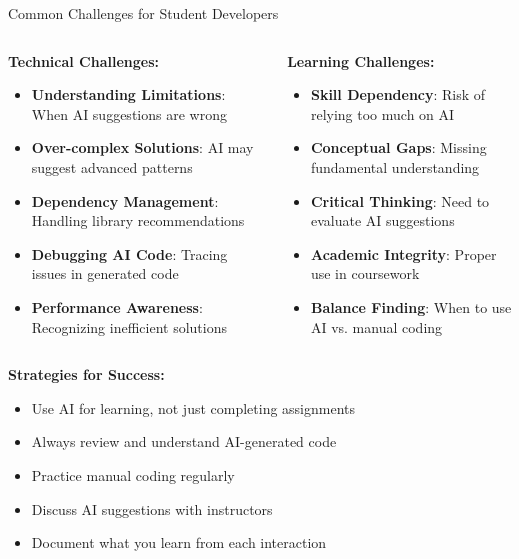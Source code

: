 \documentclass{beamer}
\begin{document}
\begin{frame}[t]{Common Challenges for Student Developers}
    \begin{columns}
        \begin{column}{0.5\textwidth}
            \textbf{Technical Challenges:}
            \begin{itemize}
                \item \textbf{Understanding Limitations}: When AI suggestions are wrong
                \item \textbf{Over-complex Solutions}: AI may suggest advanced patterns
                \item \textbf{Dependency Management}: Handling library recommendations
                \item \textbf{Debugging AI Code}: Tracing issues in generated code
                \item \textbf{Performance Awareness}: Recognizing inefficient solutions
            \end{itemize}
        \end{column}
        \begin{column}{0.5\textwidth}
            \textbf{Learning Challenges:}
            \begin{itemize}
                \item \textbf{Skill Dependency}: Risk of relying too much on AI
                \item \textbf{Conceptual Gaps}: Missing fundamental understanding
                \item \textbf{Critical Thinking}: Need to evaluate AI suggestions
                \item \textbf{Academic Integrity}: Proper use in coursework
                \item \textbf{Balance Finding}: When to use AI vs. manual coding
            \end{itemize}
        \end{column}
    \end{columns}
    
    \vspace{0.5cm}
    \textbf{Strategies for Success:}
    \begin{itemize}
        \item Use AI for learning, not just completing assignments
        \item Always review and understand AI-generated code
        \item Practice manual coding regularly
        \item Discuss AI suggestions with instructors
        \item Document what you learn from each interaction
    \end{itemize}
\end{frame}
\end{document}
